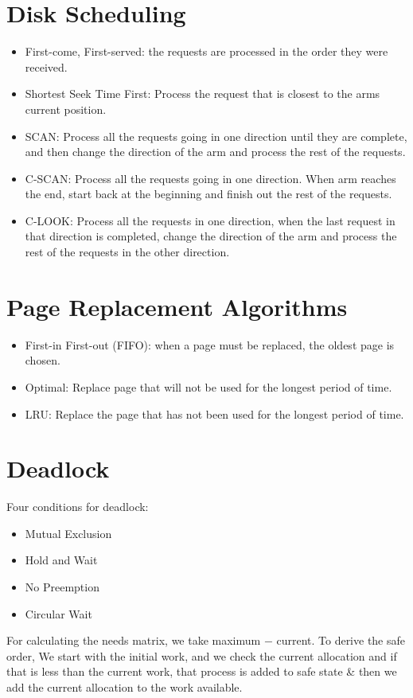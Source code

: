 \documentclass{article}
\begin{document}
\begin{multicols}{2}
    \section*{Disk Scheduling}

    \begin{itemize}
      \item First-come, First-served: the requests are processed in the order they were received.
      \item Shortest Seek Time First: Process the request that is closest to the arms current
        position.
      \item SCAN: Process all the requests going in one direction until they are complete, and then
        change the direction of the arm and process the rest of the requests.
      \item C-SCAN: Process all the requests going in one direction. When arm reaches the end, start
        back at the beginning and finish out the rest of the requests.
      \item C-LOOK: Process all the requests in one direction, when the last request in that direction
        is completed, change the direction of the arm and process the rest of the requests in the
        other direction.
    \end{itemize}

    \section*{Page Replacement Algorithms}

    \begin{itemize}
      \item First-in First-out (FIFO): when a page must be replaced, the oldest page is chosen.
      \item Optimal: Replace page that will not be used for the longest period of time.
      \item LRU: Replace the page that has not been used for the longest period of time.
    \end{itemize}

    \section*{Deadlock}

    Four conditions for deadlock:
    \begin{itemize}
      \item Mutual Exclusion
      \item Hold and Wait
      \item No Preemption
      \item Circular Wait
    \end{itemize}

    For calculating the needs matrix, we take maximum $-$ current. To derive the safe order, We
    start with the initial work, and we check the current allocation and if that is less than the
    current work, that process is added to safe state \& then we add the current allocation to the
    work available.
  \end{multicols}
\end{document}
